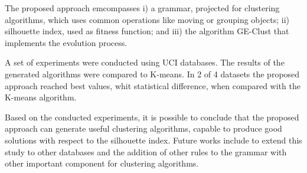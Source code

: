\documentclass[journal]{IEEEtran}
\begin{document}
	The proposed approach emcompasses i) a grammar,  projected for clustering algorithms, which uses common operations like moving or grouping objects; ii)  silhouette index, used as fitness function; and iii) the algorithm GE-Clust that implements the evolution process. 

	A set of experiments were conducted using UCI databases. The results of the generated algorithms were compared to K-means. In 2 of 4 datasets the proposed approach reached best values, whit statistical difference, when compared with the K-means algorithm.

	Based on the conducted experiments, it is possible to conclude that the proposed approach can generate useful clustering algorithms, capable to produce good solutions with respect to the silhouette index. Future works include to extend this study to other databases and the addition of other rules to the grammar with other important component for clustering algorithms.
	




	
	
	
\end{document}

